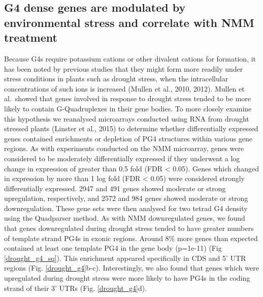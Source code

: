 \documentclass[12pt,a4paper,]{report}
\begin{document}
\newpage

\hypertarget{g4-dense-genes-are-modulated-by-environmental-stress-and-correlate-with-nmm-treatment}{%
\subsection{G4 dense genes are modulated by environmental stress and
correlate with NMM
treatment}\label{g4-dense-genes-are-modulated-by-environmental-stress-and-correlate-with-nmm-treatment}}

Because G4s require potassium cations or other divalent cations for
formation, it has been noted by previous studies that they might form
more readily under stress conditions in plants such as drought stress,
when the intracellular concentrations of such ions is increased (Mullen
et al., 2010, 2012). Mullen et al.~showed that genes involved in
response to drought stress tended to be more likely to contain
G-Quadruplexes in their gene bodies. To more closely examine this
hypothesis we reanalysed microarrays conducted using RNA from drought
stressed plants (Linster et al., 2015) to determine whether
differentially expressed genes contained enrichments or depletion of PG4
structures within various gene regions. As with experiments conducted on
the NMM microarray, genes were considered to be moderately
differentially expressed if they underwent a log change in expression of
greater than 0.5 fold (FDR \textless{} 0.05). Genes which changed in
expression by more than 1 log fold (FDR \textless{} 0.05) were
considered strongly differentially expressed. 2947 and 491 genes showed
moderate or strong upregulation, respectively, and 2572 and 984 genes
showed moderate or strong downregulation. These gene sets were then
analysed for two tetrad G4 density using the Quadparser method. As with
NMM downregulated genes, we found that genes downregulated during
drought stress tended to have greater numbers of template strand PG4s in
exonic regions. Around 8\% more genes than expected contained at least
one template PG4 in the gene body (p=1e-11) (Fig \ref{drought_g4_sq}).
This enrichment appeared specifically in CDS and 5' UTR regions (Fig.
\ref{drought_g4}b-c). Interestingly, we also found that genes which were
upregulated during drought stress were more likely to have PG4s in the
coding strand of their 3' UTRs (Fig. \ref{drought_g4}d).

\newpage
\end{document}
